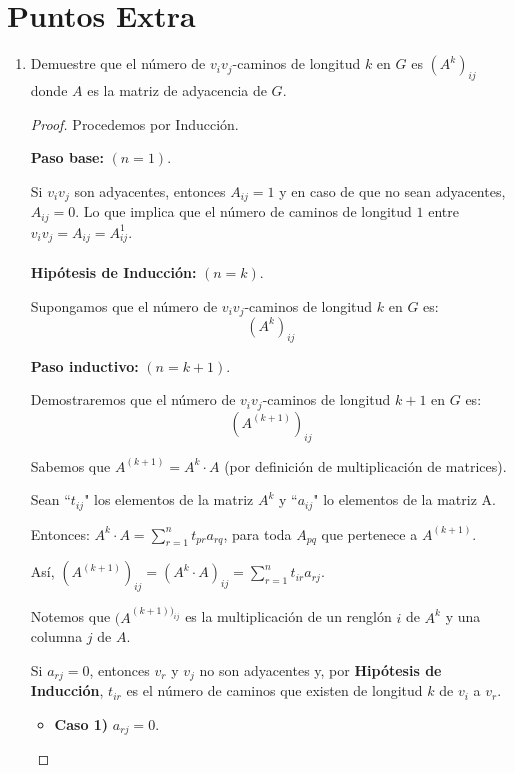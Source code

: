 \documentclass{article}
\begin{document}
  \section*{Puntos Extra}
  \begin{enumerate}
    \item Demuestre que el n\'umero de $v_i v_j$-caminos de longitud $k$ en $G$ es
      $(A^k)_{ij}$ donde $A$ es la matriz de adyacencia de $G$.

      \renewcommand\qedsymbol{QED}
      \begin{proof}
        Procedemos por Inducción.

        \textbf{Paso base:} $(n = 1)$.

        Si $v_i v_j$ son adyacentes, entonces $A_{ij}=1$ y en caso de que no sean
        adyacentes, $A_{ij} = 0$. Lo que implica que el n\'umero de caminos
        de longitud $1$ entre $v_i v_j = A_{ij} = A^{1}_{ij}$. \\
        \\
        \textbf{Hipótesis de Inducción:} $(n = k)$.

        Supongamos que el número de $v_i v_j$-caminos de longitud $k$ en $G$ es:
        $$(A^k)_{ij}$$

        \textbf{Paso inductivo:} $(n = k+1)$.

        Demostraremos que el número de $v_i v_j$-caminos de longitud $k+1$ en $G$ es:
        $$(A^{(k+1)})_{ij}$$

        Sabemos que $A^{(k+1)} = A^k \cdot A$ (por definición de multiplicación de matrices).

        Sean ``$t_{ij}$" los elementos de la matriz $A^k$ y ``$a_{ij}$" lo elementos de la matriz A.

        Entonces: $A^k \cdot A = \displaystyle \sum_{r=1}^{n} t_{pr} a_{rq}$, para toda $A_{pq}$ que pertenece a
        $A^{(k+1)}$.

        Así, $(A^{(k+1)})_{ij} = (A^k \cdot A)_{ij} = \displaystyle \sum_{r=1}^{n} t_{ir}a_{rj}$.

        Notemos que $(A^{(k+1))_{ij}}$ es la multiplicación de un renglón $i$ de $A^k$ y una columna $j$ de $A$.

        Si $a_{rj} = 0$, entonces $v_r$ y $v_j$ no son adyacentes y, por
        \textbf{Hipótesis de Inducción}, $t_{ir}$ es el número de caminos que existen de longitud $k$
        de $v_i$ a $v_r$.

        \begin{itemize}
          \item \textbf{Caso 1)} $a_{rj} = 0$.


\end{itemize}
\end{proof}
\end{enumerate}
\end{document}
